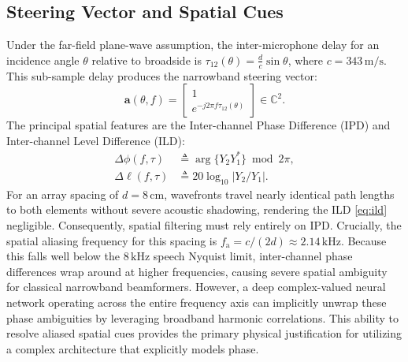 \documentclass[journal,10pt]{IEEEtran}
\newcommand{\C}{\mathbb{C}}
\newcommand{\ba}{\mathbf{a}}
\begin{document}
\subsection{Steering Vector and Spatial Cues}
Under the far-field plane-wave assumption, the inter-microphone delay for an incidence angle \(\theta\) relative to broadside is \(\tau_{12}(\theta)=\frac{d}{c}\sin\theta\), where \(c=343\,\mathrm{m/s}\). This sub-sample delay produces the narrowband steering vector:
\begin{equation}
\ba(\theta,f)=\begin{bmatrix}1\\ e^{-j2\pi f\tau_{12}(\theta)}\end{bmatrix}\in\C^2.
\label{eq:steering}
\end{equation}
The principal spatial features are the Inter-channel Phase Difference (IPD) and Inter-channel Level Difference (ILD):
\begin{align}
\Delta\phi(f,\tau)&\triangleq\arg\{Y_2 Y_1^\ast\}\bmod 2\pi,\label{eq:ipd}\\
\Delta\ell(f,\tau)&\triangleq 20\log_{10}|Y_2/Y_1|.\label{eq:ild}
\end{align}
For an array spacing of \(d=8\,\mathrm{cm}\), wavefronts travel nearly identical path lengths to both elements without severe acoustic shadowing, rendering the ILD \eqref{eq:ild} negligible. Consequently, spatial filtering must rely entirely on IPD. Crucially, the spatial aliasing frequency for this spacing is \(f_{\mathrm{a}}=c/(2d) \approx 2.14\,\mathrm{kHz}\). Because this falls well below the \(8\,\mathrm{kHz}\) speech Nyquist limit, inter-channel phase differences wrap around at higher frequencies, causing severe spatial ambiguity for classical narrowband beamformers. However, a deep complex-valued neural network operating across the entire frequency axis can implicitly unwrap these phase ambiguities by leveraging broadband harmonic correlations. This ability to resolve aliased spatial cues provides the primary physical justification for utilizing a complex architecture that explicitly models phase.
\end{document}
